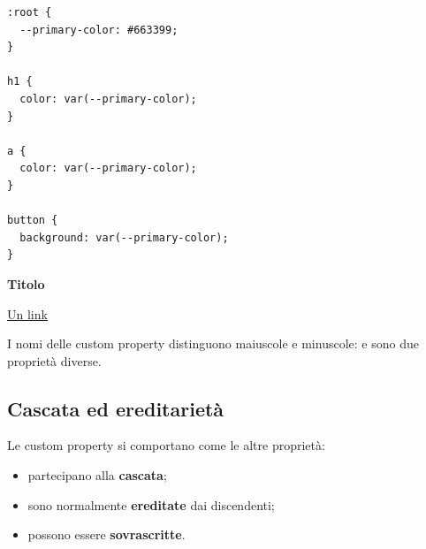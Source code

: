 
\begin{affianco}[0.5][c]
\begin{lstlisting}[style=css, name=variabili.css]
:root {
  --primary-color: #663399;
}

h1 {
  color: var(--primary-color);
}

a {
  color: var(--primary-color);
}

button {
  background: var(--primary-color);
}
\end{lstlisting}
\risultato
\begin{browser}
  {\Lora\bfseries\LARGE\textcolor{css-rebeccapurple}{Titolo}}\par\vspace{6pt}
  \textcolor{css-rebeccapurple}{\uline{Un link}}\par\vspace{6pt}
\end{browser}
\end{affianco}

I nomi delle custom property distinguono maiuscole e minuscole:
 e  sono due proprietà diverse.

\subsection{Cascata ed ereditarietà}

Le custom property si comportano come le altre proprietà:

\begin{itemize}
  \item partecipano alla \textbf{cascata};
  \item sono normalmente \textbf{ereditate} dai discendenti;
  \item possono essere \textbf{sovrascritte}.
\end{itemize}

